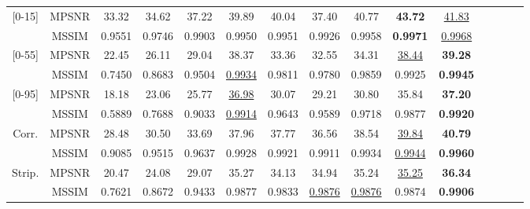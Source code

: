 \begin{table}[H]
{\begin{tabular}{c c c c c c c c c c c c c c c}
		\hline
		\hline
		\multirow{2}{*}{\hspace{5pt} [0-15] } & MPSNR   & 33.32  & 34.62  & 37.22  & 39.89              & 40.04  & 37.40              & 40.77              & \textbf{43.72}     & \underline{41.83}\\
		                                      & MSSIM   & 0.9551 & 0.9746 & 0.9903 & 0.9950             & 0.9951 & 0.9926             & 0.9958             & \textbf{0.9971}    & \underline{0.9968}\\
		\hline
		\multirow{2}{*}{\hspace{5pt}[0-55] }  & MPSNR   & 22.45  & 26.11  & 29.04  & 38.37              & 33.36  & 32.55              & 34.31              & \underline{38.44}  & \textbf{39.28}  \\
		                                      & MSSIM   & 0.7450 & 0.8683 & 0.9504 & \underline{0.9934} & 0.9811 & 0.9780             & 0.9859             & 0.9925             & \textbf{0.9945}   \\
		\hline
		\multirow{2}{*}{\hspace{5pt}[0-95] }  & MPSNR   & 18.18  & 23.06  & 25.77  & \underline{36.98}  & 30.07  & 29.21              & 30.80              & 35.84              & \textbf{37.20} \\
		                                      & MSSIM   & 0.5889 & 0.7688 & 0.9033 & \underline{0.9914} & 0.9643 & 0.9589             & 0.9718             & 0.9877             & \textbf{0.9920}   \\
		\hline
		\hline
		\multirow{2}{*}{\hspace{5pt}Corr. }   & MPSNR   & 28.48  & 30.50  & 33.69  & 37.96              & 37.77  & 36.56              & 38.54              & \underline{39.84}  & \textbf{40.79} \\
		                                      & MSSIM   & 0.9085 & 0.9515 & 0.9637 & 0.9928             & 0.9921 & 0.9911             & 0.9934             & \underline{0.9944} & \textbf{0.9960}  \\
		\hline
		\hline
		\multirow{2}{*}{\hspace{5pt}Strip. }  & MPSNR   & 20.47  & 24.08  & 29.07  & 35.27              & 34.13  & 34.94              & 35.24              & \underline{35.25}  & \textbf{36.34} \\
		                                      & MSSIM   & 0.7621 & 0.8672 & 0.9433 & 0.9877             & 0.9833 & \underline{0.9876} & \underline{0.9876} & 0.9874             & \textbf{0.9906}   \\
		\bottomrule
	\end{tabular}
}
\end{table}
